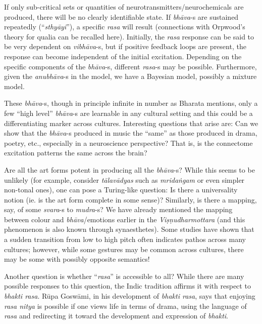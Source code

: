 If only sub-critical sets or quantities of neurotransmitters/neuro\-chemicals are produced, there will be no clearly identifiable state. If \textsl{bhāva}-s are sustained repeatedly (“\textsl{sthyāyi}”), a specific \textsl{rasa} will result (connections with Orpwood’s theory for qualia can be recalled here). Initially, the \textsl{rasa} response can be said to be very dependent on \textsl{vibhāva}-s, but if positive feedback loops are present, the response can become independent of the initial excitation. Depending on the specific components of the \textsl{bhāva}-s, different \textsl{rasa}-s may be possible. Furthermore, given the \textsl{anubhāva}-s in the model, we have a Bayesian model, possibly a mixture model.  

These \textsl{bhāva}-s, though in principle infinite in number as Bharata mentions, only a few “high level” \textsl{bhāva}-s are learnable in any cultural setting and this could be a differentiating marker across cultures. Interesting questions that arise are: Can we show that the \textsl{bhāva}-s produced in music the “same” as those produced in drama, poetry, etc., especially in a neuroscience perspective? That is, is the connectome excitation patterns the same across the brain?

Are all the art forms potent in producing all the \textsl{bhāva}-s? While this seems to be unlikely (for example, consider \textsl{tālavādyas} such as \textsl{mridaṅgam} or even simpler non-tonal ones), one can pose a Turing-like question: Is there a universality notion (ie. is the art form complete in some sense)? Similarly, is there a mapping, say, of some \textsl{svara}-s to \textsl{mudra}-s? We have already mentioned the mapping between colour and \textsl{bhāva}/emotions earlier in the \textsl{Viṣṇudharmottara} (and this phenomenon is also known through synaesthetes). Some studies have shown that a sudden transition from low to high pitch often indicates pathos across many cultures; however, while some gestures may be common across cultures, there may be some with possibly opposite semantics!

Another question is whether “\textsl{rasa}” is accessible to all? While there are many possible responses to this question, the Indic tradition affirms it with respect to \textsl{bhakti rasa}. Rūpa Goswāmi, in his development of \textsl{bhakti rasa}, says that enjoying \textsl{rasa nitya} is possible if one views life in terms of drama, using the language of \textsl{rasa} and redirecting it toward the development and expression of \textsl{bhakti}.

